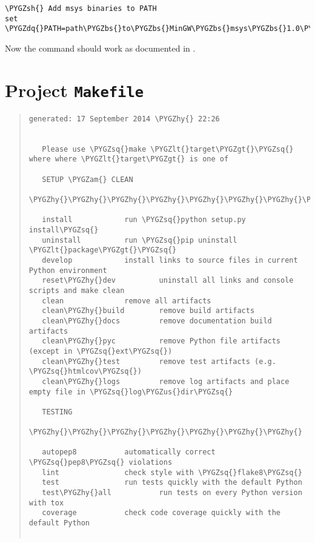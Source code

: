 \documentclass[letterpaper,10pt,english]{sphinxmanual}
\def\PYGZbs{\char`\\}
\def\PYGZus{\char`\_}
\def\PYGZam{\char`\&}
\def\PYGZlt{\char`\<}
\def\PYGZgt{\char`\>}
\def\PYGZsh{\char`\#}
\def\PYGZpc{\char`\%}
\def\PYGZhy{\char`\-}
\def\PYGZsq{\char`\'}
\def\PYGZdq{\char`\"}
\renewcommand\PYGZsq{\textquotesingle}
\begin{document}
\begin{Verbatim}[commandchars=\\\{\}]
\PYGZsh{} Add msys binaries to PATH
set \PYGZdq{}PATH=path\PYGZbs{}to\PYGZbs{}MinGW\PYGZbs{}msys\PYGZbs{}1.0\PYGZbs{}bin;\PYGZpc{}PATH\PYGZpc{}\PYGZdq{}
\end{Verbatim}

Now the  command should work as documented in .


\section{Project \texttt{Makefile}}
\label{project_makefile:project-makefile}\label{project_makefile::doc}\begin{quote}

\begin{Verbatim}[commandchars=\\\{\}]
generated: 17 September 2014 \PYGZhy{} 22:26


   Please use \PYGZsq{}make \PYGZlt{}target\PYGZgt{}\PYGZsq{} where where \PYGZlt{}target\PYGZgt{} is one of

   SETUP \PYGZam{} CLEAN
   \PYGZhy{}\PYGZhy{}\PYGZhy{}\PYGZhy{}\PYGZhy{}\PYGZhy{}\PYGZhy{}\PYGZhy{}\PYGZhy{}\PYGZhy{}\PYGZhy{}\PYGZhy{}\PYGZhy{}

   install            run \PYGZsq{}python setup.py install\PYGZsq{}
   uninstall          run \PYGZsq{}pip uninstall \PYGZlt{}package\PYGZgt{}\PYGZsq{}
   develop            install links to source files in current Python environment
   reset\PYGZhy{}dev          uninstall all links and console scripts and make clean
   clean              remove all artifacts
   clean\PYGZhy{}build        remove build artifacts
   clean\PYGZhy{}docs         remove documentation build artifacts
   clean\PYGZhy{}pyc          remove Python file artifacts (except in \PYGZsq{}ext\PYGZsq{})
   clean\PYGZhy{}test         remove test artifacts (e.g. \PYGZsq{}htmlcov\PYGZsq{})
   clean\PYGZhy{}logs         remove log artifacts and place empty file in \PYGZsq{}log\PYGZus{}dir\PYGZsq{}

   TESTING
   \PYGZhy{}\PYGZhy{}\PYGZhy{}\PYGZhy{}\PYGZhy{}\PYGZhy{}\PYGZhy{}

   autopep8           automatically correct \PYGZsq{}pep8\PYGZsq{} violations
   lint               check style with \PYGZsq{}flake8\PYGZsq{}
   test               run tests quickly with the default Python
   test\PYGZhy{}all           run tests on every Python version with tox
   coverage           check code coverage quickly with the default Python


\end{Verbatim}
\end{quote}
\end{document}
